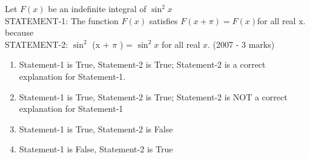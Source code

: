\iffalse
\title{Assignment}
\author{K.AKSHAY TEJA}
\section{ar}
\fi

\item   Let $F(x)$ be an indefinite integral of $\sin^2 x$\\

STATEMENT-1: The function $F(x)$ satisfies $F(x+\pi)=F(x)$for all real x. because\\
STATEMENT-2: $\sin^2$ (x + $\pi$ ) = $\sin^2 x$ for all real $x$.   \hfill     (2007 - 3 marks)
  
    \begin{enumerate}
    
 \item Statement-1 is True, Statement-2 is True; Statement-2 is a correct explanation for Statement-1.
\item Statement-1 is True, Statement-2 is True; Statement-2 is NOT a correct explanation for Statement-1
 \item Statement-1 is True, Statement-2 is False
\item Statement-1 is False, Statement-2 is True
\end{enumerate}
